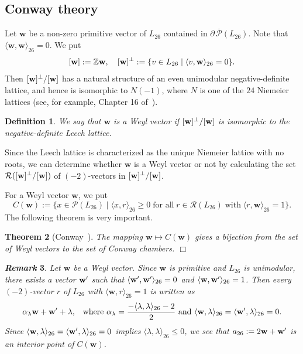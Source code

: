 \documentclass{amsart}
\newtheorem{theorem}{Theorem}[section]
\newtheorem{_definition}[theorem]{Definition}
\newenvironment{definition}{\begin{_definition}\rm}{\end{_definition}}
\newtheorem{_remark}[theorem]{\it Remark}
\newenvironment{remark}{\begin{_remark}\rm}{\end{_remark}}
\numberwithin{equation}{section}
\numberwithin{table}{section}
\numberwithin{figure}{section}
\newcommand{\Z}{\mathord{\mathbb Z}}
\newcommand{\PPP}{\mathord{\mathcal P}}
\newcommand{\RRR}{\mathord{\mathcal R}}
\newcommand{\set}[2]{\{ {#1}\mid {#2}  \}}
\newcommand{\sprime}{\sp\prime}
\newcommand{\sperp}{\sp{\perp}}
\newcommand{\bdr}{\partial\,}
\newcommand{\weyl}{\mathord{\mathbf w}}
\newcommand{\intfLL}[1]{\langle #1\rangle_{26}}
\renewcommand{\qed}{\hfill {$\Box$}}
\begin{document}
\subsection{Conway theory}\label{subsec:weyl}
%
Let $\weyl$ be a non-zero primitive vector of $L_{26}$
contained in  $\bdr\overline{\PPP}(L_{26})$.
Note that $\intfLL{\weyl, \weyl}=0$.
We put
\[
[\weyl]:=\Z \weyl, \quad [\weyl]\sperp:=\set{v\in L_{26}}{\intfLL{v, \weyl}=0}.
\]
Then  $[\weyl]\sperp/[\weyl]$ has a natural structure of an even unimodular negative-definite lattice,
and hence is isomorphic to $N(-1)$,
where $N$ is one of the $24$ Niemeier lattices
(see, for example, Chapter 16 of~\cite{CSBook}).
%
\begin{definition}
We say that $\weyl$ is a Weyl vector if $[\weyl]\sperp/[\weyl]$
is isomorphic to the negative-definite Leech lattice.
\end{definition}
%
Since the Leech lattice is characterized as the unique Niemeier lattice
with no roots,
we can determine whether $\weyl$ is a Weyl vector or not by
calculating the set $\RRR([\weyl]\sperp/[\weyl])$
of $(-2)$-vectors in $[\weyl]\sperp/[\weyl]$.
\par
For a Weyl vector $\weyl$, we put
\[
C(\weyl):=\set{x\in \PPP(L_{26})}{\intfLL{x, r}\ge 0\;\textrm{for all}\; r\in \RRR(L_{26})\;\textrm{with}\; \intfLL{r, \weyl}=1}.
\]
%
The following theorem is very important.
%
\begin{theorem}[Conway~\cite{Conway1983}]
The mapping $\weyl\mapsto C(\weyl)$ gives a bijection from the set of Weyl vectors
to the set of Conway chambers.
\qed
\end{theorem}
%
\begin{remark}\label{rem:weylample}
Let $\weyl$ be a Weyl vector.
Since $\weyl$ is primitive and $L_{26}$ is unimodular,
there exists a vector $\weyl\sprime$ such that
$\intfLL{\weyl\sprime,\weyl\sprime}=0$ and $\intfLL{\weyl,\weyl\sprime}=1$.
Then  every $(-2)$-vector $r$ of $L_{26}$ with $\intfLL{\weyl,r}=1$ is written as
\[
 \alpha_{\lambda}\weyl+\weyl\sprime+\lambda, \;\;\;
 \textrm{where $\alpha_\lambda=\frac{-\intfLL{\lambda, \lambda}-2}{2}$ and $\intfLL{\weyl, \lambda}=\intfLL{\weyl\sprime,\lambda}=0$}.
\]
Since $\intfLL{\weyl, \lambda}=\intfLL{\weyl\sprime, \lambda}=0$ implies  $\intfLL{\lambda, \lambda}\le 0$,
we see that  $a_{26}:=2\weyl+\weyl\sprime$ is an interior point of $C(\weyl)$.
 \end{remark}
%
\end{document}
